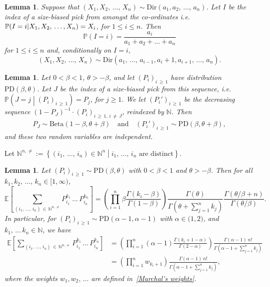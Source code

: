 \documentclass[10pt]{amsart}
\newtheorem{lemm}[theo]{Lemma}\newtheorem{prop}[theo]{Proposition}\newtheorem{coro}[theo]{Corollary}\newtheorem{conj}[theo]{Conjecture}
\theoremstyle{definition}\newtheorem{defi}[theo]{Definition}\newtheorem{rema}[theo]{Remark}\newtheorem{exam}[theo]{Example}\newtheorem{exem}[theo]{Example}\newtheorem{nota}[theo]{Notation}
\newcommand{\Ec}[1]{\mathbb{E} \left[#1\right]}
\newcommand{\enstq}[2]{\left\lbrace#1\mathrel{}\middle|\mathrel{}#2\right\rbrace}
\newcommand{\Ppsq}[2]{\mathbb{P} \left(#1\mathrel{}\middle|\mathrel{}#2\right)}
\newcommand{\intervalle}[4]{\mathopen{#1}#2
\mathclose{}\mathpunct{},#3
\mathclose{#4}}
\newcommand{\intervallefo}[2]{\intervalle{[}{#1}{#2}{)}}
\newcommand{\intervalleoo}[2]{\intervalle{(}{#1}{#2}{)}}
\newcommand{\Prob}[1]{\ensuremath{\mathbb{P} \left(#1 \right)}}
\newcommand{\Betal}{\mathrm{Beta}}
\newcommand{\PD}{\mathrm{PD}}
\newcommand{\Dir}{\mathrm{Dir}}
\newcommand{\N}{\mathbb{N}}
\newcommand{\bbP}{\mathbb{P}}
\begin{document}

\begin{lemm}\label{lem:biasDir}
Suppose that $(X_1, X_2,\,\ldots,\,X_n) \sim \Dir(a_1, a_2,\,\ldots,\,a_n)$. Let $I$ be the index of a size-biased pick from amongst the co-ordinates i.e. $\bbP(I=i|X_1, X_2,\,\ldots,\linebreak X_n)  = X_i$, for $1 \le i \le n$. Then
\[
\Prob{I = i} = \frac{a_i}{a_1 + a_2 + \ldots + a_n}
\]
for $1 \le i \le n$ and, conditionally on $I=i$,
\[
\left(X_1, X_2,\,\ldots,\,X_n\right) \sim \Dir\left(a_1,\,\ldots,\,a_{i-1}, a_i + 1, a_{i+1}, \,\ldots,\,a_n\right).
\]
\end{lemm}


\begin{lemm}\label{lem:PD factorisation}
Let $0<\beta<1$, $\theta>-\beta$, and let $(P_i)_{i\,\geq\,1}$ have distribution $\PD(\beta,\theta)$. Let $J$ be the index of a size-biased pick from this sequence, i.e. $\Ppsq{J=j}{(P_i)_{i\,\geq\,1}}=P_j$, for $j\geq 1$. We let $(P_i')_{i\,\geq\,1}$ be the decreasing sequence $(1-P_J)^{-1}\cdot (P_i)_{i\,\ge\, 1,\,i\,\neq\,J}$, reindexed by $\N$. Then
\begin{align*}
P_J\sim \Betal(1-\beta,\theta+\beta) \quad \text{and} \quad \left(P_i'\right)_{i\,\geq\,1} \sim \PD(\beta,\theta+\beta),
\end{align*}
and these two random variables are independent.
\end{lemm}


Let $\N^{n,\neq}:=\enstq{(i_1,\,\dots,\,i_n)\in \N^n }{i_1,\,\dots,\,i_n \text{ are distinct}}$.
\begin{lemm}\label{lem:pd}
Let $(P_i)_{i\,\geq\,1} \sim \PD(\beta,\theta)$ with $0<\beta<1$ and $\theta>-\beta$. Then for all $k_1, k_2,\,\dots,\, k_n \in \intervallefo{1}{\infty}$,
\begin{equation}\label{eq:momentsPD}
\Ec{\sum_{\left(i_1,\,\dots,\,i_n\right)\,\in\,\N^{n,\neq}}P_{i_1}^{k_1}\,\dots\,P_{i_n}^{k_n}}= \left(\prod_{i=1}^n \beta \frac{\Gamma(k_i-\beta)}{\Gamma(1-\beta)}\right)\frac{\Gamma(\theta)}{\Gamma\left(\theta+\sum\limits_{j=1}^n k_j\right)} \frac{\Gamma(\theta/\beta+n)}{\Gamma(\theta/\beta)}.
\end{equation}
In particular, for $(P_i)_{i\,\geq\,1} \sim \PD(\alpha-1,\alpha -1)$ with $\alpha\in\intervalleoo{1}{2}$, and $k_1,\,\dots\,k_n \in \N$, we have
\begin{align*}
\Ec{\sum_{\left(i_1,\,\dots,\,i_n\right)\,\in\,\N^{n,\neq}}P_{i_1}^{k_1}\,\dots\,P_{i_n}^{k_n}}&= \left(\prod_{i=1}^n (\alpha-1) \frac{\Gamma\left(k_i+1-\alpha\right)}{\Gamma(2-\alpha)}\right)\frac{\Gamma(\alpha-1) \ n!}{\Gamma\left(\alpha-1+\sum\limits_{j=1}^n k_j\right)} \\
&= \left(\prod_{i=1}^n w_{k_i+1}\right) \frac{\Gamma(\alpha-1) \ n!}{\Gamma\left(\alpha-1+\sum\limits_{j=1}^n k_j\right)},
\end{align*}
where the weights $w_1,w_2,\,\dots$ are defined in~\eqref{Marchal's weights}.
\end{lemm}
\end{document}
